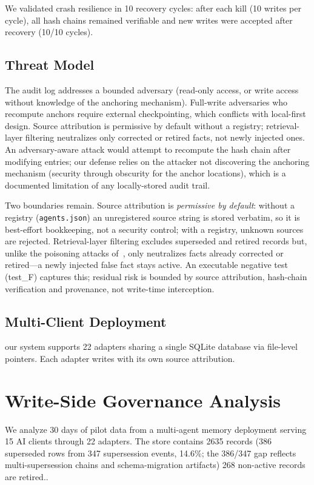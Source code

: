 \documentclass{llncs}
\begin{document}
We validated crash resilience in 10 recovery cycles: after each kill (10 writes per cycle), all hash chains remained verifiable and new writes were accepted after recovery (10/10 cycles).

\subsection{Threat Model}

The audit log addresses a bounded adversary (read-only access, or write access without knowledge of the anchoring mechanism). Full-write adversaries who recompute anchors require external checkpointing, which conflicts with local-first design. Source attribution is permissive by default without a registry; retrieval-layer filtering neutralizes only corrected or retired facts, not newly injected ones. An adversary-aware attack would attempt to recompute the hash chain after modifying entries; our defense relies on the attacker not discovering the anchoring mechanism (security through obscurity for the anchor locations), which is a documented limitation of any locally-stored audit trail.

Two boundaries remain. Source attribution is \emph{permissive by default}: without a registry (\texttt{agents.json}) an unregistered source string is stored verbatim, so it is best-effort bookkeeping, not a security control; with a registry, unknown sources are rejected. Retrieval-layer filtering excludes superseded and retired records but, unlike the poisoning attacks of~\cite{sleeper,agentpoison}, only neutralizes facts already corrected or retired---a newly injected false fact stays active. An executable negative test (test\_F) captures this; residual risk is bounded by source attribution, hash-chain verification and provenance, not write-time interception.

\subsection{Multi-Client Deployment}
our system supports 22 adapters sharing a single SQLite database via file-level pointers. Each adapter writes with its own source attribution.

\section{Write-Side Governance Analysis}


We analyze 30 days of pilot data from a multi-agent memory deployment serving 15 AI clients through 22 adapters. The store contains 2{}635 records (386 superseded rows from 347 supersession events, 14.6\%; the 386/347 gap reflects multi-supersession chains and schema-migration artifacts) 268 non-active records are retired..
\end{document}
